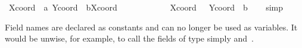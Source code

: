 \begin{isabellebody}
\isamarkuptrue%
\isamarkupfalse%
\ {}{}Xcoord\ {}\ a{}\ Ycoord\ {}\ b{}{}Xcoord\ {}{}\ {}{}\ {}\isanewline
\ \ \ \ \ \ \ \ \ {}Xcoord\ {}\ {}{}\ Ycoord\ {}\ b{}{}\isanewline
%
\isadelimproof
\ \ %
\endisadelimproof
%
\isatagproof
{}\isamarkupfalse%
\ simp%
\endisatagproof
{\isafoldproof}%
%
\isadelimproof
%
\endisadelimproof
%
\begin{isamarkuptext}%
\begin{warn}
  Field names are declared as constants and can no longer be used as
  variables.  It would be unwise, for example, to call the fields of
  type  simply  and~.
  \end{warn}%
\end{isamarkuptext}%
\isamarkuptrue%
%
\isamarkuptrue%
%
\begin{isamarkuptext}%
%


\end{isamarkuptext}
\end{isabellebody}

